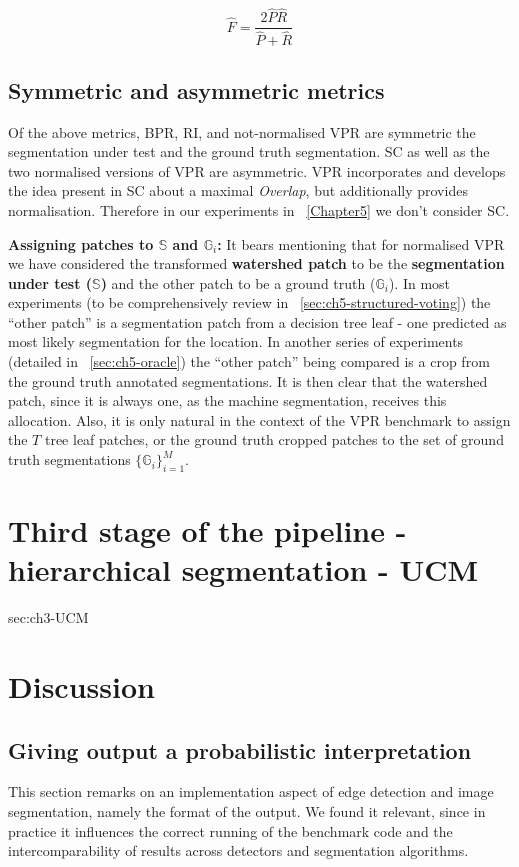 \[
\hat{{F}}=\frac{2\hat{P}\hat{R}}{\hat{P}+\hat{R}}
\]

\subsection*{Symmetric and asymmetric metrics}
Of the above metrics, BPR, RI, and not-normalised VPR are symmetric \wrt the segmentation under test and the ground truth segmentation. SC as well as the two normalised versions of VPR are asymmetric. VPR incorporates and develops the idea present in SC about a maximal \textit{Overlap}, but additionally provides normalisation. Therefore in our experiments in \textsection~\ref{Chapter5} we don't consider SC.


\textbf{Assigning patches to $\mathbb{S}$ and $\mathbb{G}_i$:} It bears mentioning %
that for normalised VPR we have considered the transformed \textbf{watershed patch} to be the \textbf{segmentation under test ($\mathbb{S}$)} and the other patch to be a ground truth ($\mathbb{G}_i$). 
In most experiments (to be comprehensively %
review in \textsection~\ref{sec:ch5-structured-voting}) the ``other patch'' is a segmentation patch from a decision tree leaf - one predicted as most likely segmentation for the location. In another series of experiments (detailed in \textsection~\ref{sec:ch5-oracle}) the ``other patch'' being compared is a crop from the ground truth annotated segmentations.
It is then clear that the watershed patch, since it is always one, as the machine segmentation, receives this allocation. Also, it is only natural in the context of the VPR benchmark to assign the $T$ tree leaf patches, or the ground truth cropped patches to the set of ground truth segmentations $\{\mathbb{G}_i\}_{i=1}^M$.

\section[Third stage of the pipeline - UCM]{Third stage of the pipeline - hierarchical segmentation - UCM}
{sec:ch3-UCM}

\section{Discussion}
\subsection*{Giving output a probabilistic interpretation}
This section remarks on an implementation aspect of edge detection and image segmentation, namely the format of the output. We found it relevant, since in practice it influences the correct running of the benchmark code and the intercomparability %
of results across detectors and segmentation algorithms.

